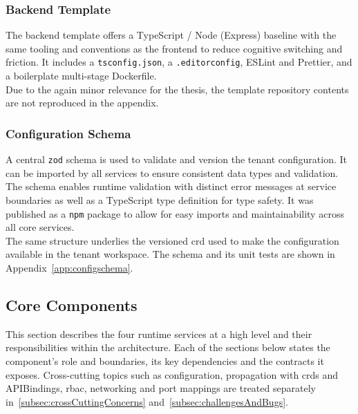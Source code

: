 \documentclass[11pt, a4paper, oneside, listof=totoc]{scrartcl}
\begin{document}
            \subsubsection{Backend Template}\label{subsubsec:backendTemplate}
                The backend template offers a TypeScript / Node (Express) baseline with the same
                tooling and conventions as the frontend to reduce cognitive switching and friction.
                It includes a \texttt{tsconfig.json}, a \texttt{.editorconfig}, ESLint and Prettier,
                and a boilerplate multi-stage Dockerfile.\\
                Due to the again minor relevance for the thesis, the template repository contents
                are not reproduced in the appendix.

            \subsubsection{Configuration Schema}\label{subsubsec:configSchema}
                A central \texttt{zod} schema is used to validate and version the tenant
                configuration.
                It can be imported by all services to ensure consistent data types and validation.
                The schema enables runtime validation with distinct error messages at service 
                boundaries as well as a TypeScript type definition for type safety.
                It was published as a \texttt{npm} package to allow for easy imports and
                maintainability across all core services.\\
                The same structure underlies the versioned \gls{crd} used to make the configuration
                available in the tenant workspace.
                The schema and its unit tests are shown in Appendix~\ref{app:configschema}.

    \clearpage

        \subsection{Core Components}\label{subsec:coreComponents}
            This section describes the four runtime services at a high level and their
            responsibilities within the architecture.
            Each of the sections below states the component's role and boundaries, its key
            dependencies and the contracts it exposes.
            Cross-cutting topics such as configuration, propagation with \glspl{crd} and
            APIBindings, \gls{rbac}, networking and port mappings are treated separately
            in~\ref{subsec:crossCuttingConcerns} and~\ref{subsec:challengesAndBugs}.
\end{document}
